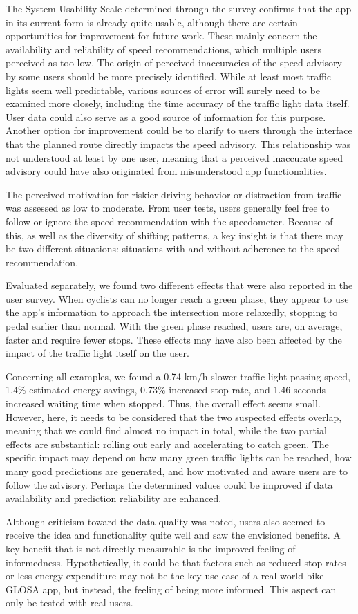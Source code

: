 The System Usability Scale determined through the survey confirms that the app in its current form is already quite usable, although there are certain opportunities for improvement for future work. These mainly concern the availability and reliability of speed recommendations, which multiple users perceived as too low. The origin of perceived inaccuracies of the speed advisory by some users should be more precisely identified. While at least most traffic lights seem well predictable, various sources of error will surely need to be examined more closely, including the time accuracy of the traffic light data itself. User data could also serve as a good source of information for this purpose. Another option for improvement could be to clarify to users through the interface that the planned route directly impacts the speed advisory. This relationship was not understood at least by one user, meaning that a perceived inaccurate speed advisory could have also originated from misunderstood app functionalities.

The perceived motivation for riskier driving behavior or distraction from traffic was assessed as low to moderate. From user tests, users generally feel free to follow or ignore the speed recommendation with the speedometer. Because of this, as well as the diversity of shifting patterns, a key insight is that there may be two different situations: situations with and without adherence to the speed recommendation. 

Evaluated separately, we found two different effects that were also reported in the user survey. When cyclists can no longer reach a green phase, they appear to use the app's information to approach the intersection more relaxedly, stopping to pedal earlier than normal. With the green phase reached, users are, on average, faster and require fewer stops. These effects may have also been affected by the impact of the traffic light itself on the user. 

Concerning all examples, we found a 0.74 km/h slower traffic light passing speed, 1.4\% estimated energy savings, 0.73\% increased stop rate, and 1.46 seconds increased waiting time when stopped. Thus, the overall effect seems small. However, here, it needs to be considered that the two suspected effects overlap, meaning that we could find almost no impact in total, while the two partial effects are substantial: rolling out early and accelerating to catch green. The specific impact may depend on how many green traffic lights can be reached, how many good predictions are generated, and how motivated and aware users are to follow the advisory. Perhaps the determined values could be improved if data availability and prediction reliability are enhanced. 

Although criticism toward the data quality was noted, users also seemed to receive the idea and functionality quite well and saw the envisioned benefits. A key benefit that is not directly measurable is the improved feeling of informedness. Hypothetically, it could be that factors such as reduced stop rates or less energy expenditure may not be the key use case of a real-world bike-GLOSA app, but instead, the feeling of being more informed. This aspect can only be tested with real users.
